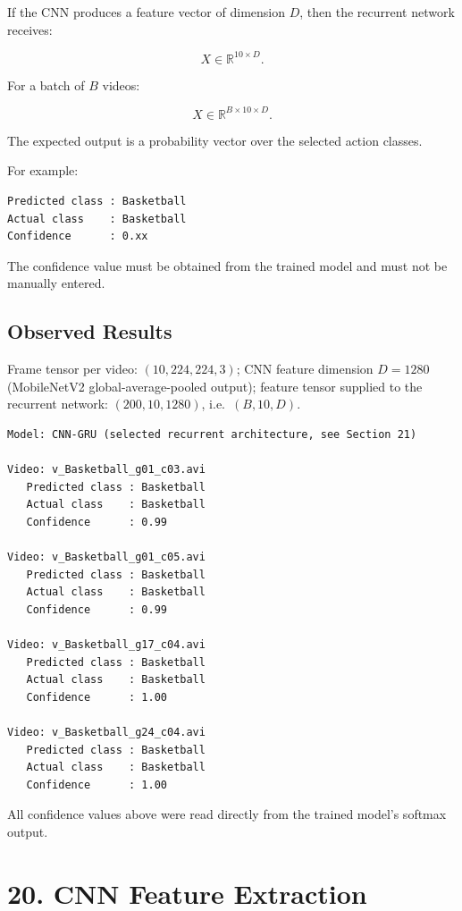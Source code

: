 \documentclass[10pt]{article}
\begin{document}
If the CNN produces a feature vector of dimension $D$, then the recurrent
network receives:

\[
X\in\mathbb{R}^{10\times D}.
\]

For a batch of $B$ videos:

\[
X\in\mathbb{R}^{B\times10\times D}.
\]

The expected output is a probability vector over the selected action classes.

For example:

\begin{verbatim}
Predicted class : Basketball
Actual class    : Basketball
Confidence      : 0.xx
\end{verbatim}

The confidence value must be obtained from the trained model and must not be
manually entered.

\subsection*{Observed Results}

Frame tensor per video: $(10,224,224,3)$; CNN feature dimension
$D=1280$ (MobileNetV2 global-average-pooled output); feature tensor supplied
to the recurrent network: $(200,10,1280)$, i.e.\ $(B,10,D)$.

\begin{verbatim}
Model: CNN-GRU (selected recurrent architecture, see Section 21)

Video: v_Basketball_g01_c03.avi
   Predicted class : Basketball
   Actual class    : Basketball
   Confidence      : 0.99

Video: v_Basketball_g01_c05.avi
   Predicted class : Basketball
   Actual class    : Basketball
   Confidence      : 0.99

Video: v_Basketball_g17_c04.avi
   Predicted class : Basketball
   Actual class    : Basketball
   Confidence      : 1.00

Video: v_Basketball_g24_c04.avi
   Predicted class : Basketball
   Actual class    : Basketball
   Confidence      : 1.00
\end{verbatim}

All confidence values above were read directly from the trained model's
softmax output.

\section*{20. CNN Feature Extraction}
\end{document}
